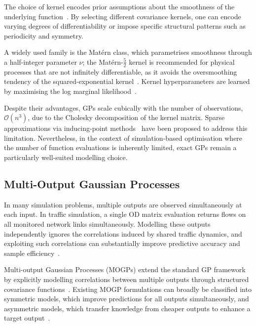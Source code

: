 \documentclass[11pt]{article}
\begin{document}
The choice of kernel encodes prior assumptions about the smoothness of the underlying function~\parencite{rasmussen2006gaussian}. By selecting different covariance kernels, one can encode varying degrees of differentiability or impose specific structural patterns such as periodicity and symmetry.



A widely used 
family is the Mat\'{e}rn class, which parametrises smoothness through a 
half-integer parameter $\nu$; the Mat\'{e}rn-$\tfrac{5}{2}$ kernel is 
recommended for physical processes that are not infinitely differentiable, 
as it avoids the oversmoothing tendency of the squared-exponential 
kernel~\parencite{snoek2012practical}. Kernel hyperparameters are learned 
by maximising the log marginal likelihood~\parencite{rasmussen2006gaussian}.

Despite their advantages, GPs scale cubically with the number of 
observations, $\mathcal{O}(n^3)$, due to the Cholesky decomposition of 
the kernel matrix. Sparse approximations via inducing-point 
methods~\parencite{quinonero2005unifying, titsias2009variational} have 
been proposed to address this limitation. Nevertheless, in the context of 
simulation-based optimisation where the number of function evaluations is 
inherently limited, exact GPs remain a particularly well-suited modelling 
choice.



\subsection{Multi-Output Gaussian Processes}
\label{sec:prelim_mogp}

In many simulation problems, multiple outputs are observed simultaneously 
at each input. In traffic simulation, a single OD matrix evaluation returns
flows on all monitored network links simultaneously. Modelling these outputs
independently ignores the correlations induced by shared traffic dynamics,
and exploiting such correlations can substantially improve predictive
accuracy and sample efficiency~\parencite{liu2018}.

Multi-output Gaussian Processes (MOGPs) extend the standard GP framework 
by explicitly modelling correlations between multiple outputs through 
structured covariance functions~\parencite{alvarez2012kernels, liu2018}. 
Existing MOGP formulations can broadly be classified into symmetric 
models, which improve predictions for all outputs simultaneously, and 
asymmetric models, which transfer knowledge from cheaper outputs to 
enhance a target output~\parencite{liu2018}. 
\end{document}
